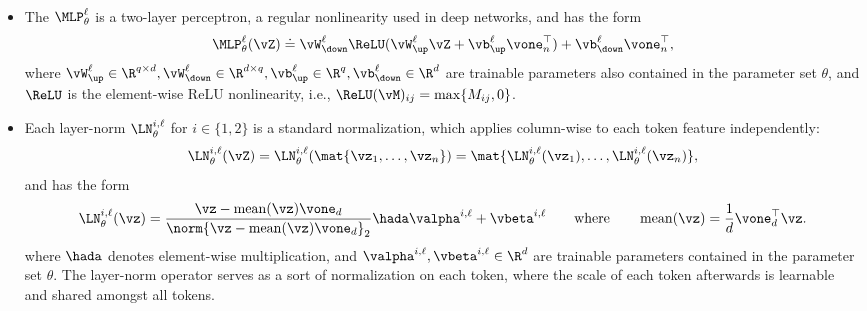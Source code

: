 \documentclass[../../book-main.tex]{subfiles}
\begin{document}
\begin{itemize}
\begin{align}
        \end{align}
        are also known as the \textit{\(k\)th attention map} and
        \textit{\(k\)th attention head output} at layer \(\ell\),
        respectively.
        Furthermore, the operation \(\SA(\vQ, \vK,
        \vV)\) can be computed extremely efficiently using
        specialized software such as FlashAttention
        \citep{shah2025flashattention}.
    \item The \(\MLP_{\theta}^{\ell}\) is a two-layer perceptron, a
        regular nonlinearity used in deep networks, and has the form
        \begin{equation}
            \MLP_{\theta}^{\ell}(\vZ) \doteq
            \vW_{\down}^{\ell}\ReLU(\vW_{\up}^{\ell}\vZ +
            \vb_{\up}^{\ell}\vone_{n}^{\top}) +
            \vb_{\down}^{\ell}\vone_{n}^{\top} ,
        \end{equation}
        where 
        \(\vW_{\up}^{\ell} \in \R^{q \times d},
            \vW_{\down}^{\ell} \in \R^{d \times q}, \vb_{\up}^{\ell} \in
        \R^{q}, \vb_{\down}^{\ell} \in \R^{d}\) are trainable
        parameters also contained in the parameter set \(\theta\),
        and \(\ReLU\) is the element-wise ReLU nonlinearity, i.e.,
        \(\ReLU(\vM)_{ij} = \max\{M_{ij}, 0\}\).
    \item Each layer-norm \(\LN_{\theta}^{i, \ell}\) for \(i \in \{1,
        2\}\) is a standard normalization, which applies column-wise
        to each token feature independently:
        \begin{equation}
            \LN_{\theta}^{i, \ell}(\vZ) = \LN_{\theta}^{i,
            \ell}(\mat{\vz_{1}, \dots, \vz_{n}}) =
            \mat{\LN_{\theta}^{i, \ell}(\vz_{1}), \dots,
            \LN_{\theta}^{i, \ell}(\vz_{n})} ,
        \end{equation}
        and has the form
        \begin{equation}
            \LN_{\theta}^{i, \ell}(\vz) = \frac{\vz
            - \operatorname{mean}(\vz)\vone_{d}}{\norm{\vz
            - \operatorname{mean}(\vz)\vone_{d}}_{2}} \hada
            \valpha^{i, \ell} + \vbeta^{i, \ell} \qquad \text{where}
            \qquad 
            \operatorname{mean}(\vz) = \frac{1}{d}\vone_{d}^{\top}\vz .
        \end{equation}
        where \(\hada\) denotes element-wise multiplication, and
        \(\valpha^{i, \ell}, \vbeta^{i, \ell} \in \R^{d}\) are
        trainable parameters contained in the parameter set
        \(\theta\).
        The layer-norm operator serves as a sort of
        normalization on each token, where the scale of each token
        afterwards is learnable and shared amongst all tokens.
\end{itemize}
\end{document}
